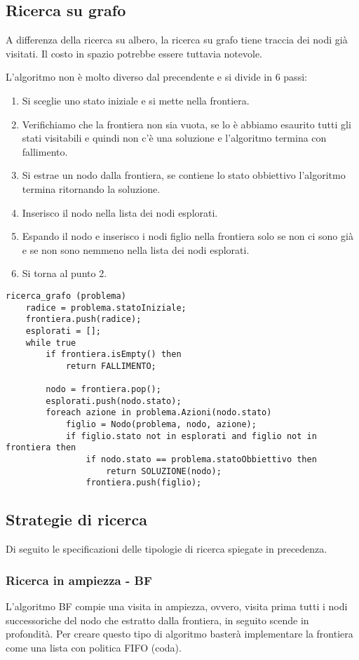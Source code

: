 \subsection{Ricerca su grafo}
A differenza della ricerca su albero, la ricerca su grafo tiene traccia dei nodi gi\`a
visitati. Il costo in spazio potrebbe essere tuttavia notevole.

L'algoritmo non \`e molto diverso dal precendente e si divide in 6 passi:
\begin{enumerate}
	\item Si sceglie uno stato iniziale e si mette nella frontiera.
	\item Verifichiamo che la frontiera non sia vuota, se lo \`e abbiamo esaurito tutti gli
	      stati visitabili e quindi non c'\`e una soluzione e l'algoritmo termina con
	      fallimento.
	\item Si estrae un nodo dalla frontiera, se contiene lo stato obbiettivo l'algoritmo
	      termina ritornando la soluzione.
	\item Inserisco il nodo nella lista dei nodi esplorati.
	\item Espando il nodo e inserisco i nodi figlio nella frontiera solo se non ci sono gi\`a
	      e se non sono nemmeno nella lista dei nodi esplorati.
	\item Si torna al punto 2.
\end{enumerate}

\begin{lstlisting}[style=pseudo-style]
ricerca_grafo (problema)
	radice = problema.statoIniziale;
	frontiera.push(radice);
	esplorati = [];
	while true
		if frontiera.isEmpty() then
			return FALLIMENTO;
		
		nodo = frontiera.pop();
		esplorati.push(nodo.stato);
		foreach azione in problema.Azioni(nodo.stato)
			figlio = Nodo(problema, nodo, azione);
			if figlio.stato not in esplorati and figlio not in frontiera then
				if nodo.stato == problema.statoObbiettivo then
					return SOLUZIONE(nodo);
				frontiera.push(figlio);
\end{lstlisting}

\subsection{Strategie di ricerca}
Di seguito le specificazioni delle tipologie di ricerca spiegate in precedenza.

\subsubsection{Ricerca in ampiezza - BF}
L'algoritmo BF compie una visita in ampiezza, ovvero, visita prima tutti i nodi
successoriche del nodo che estratto dalla frontiera, in seguito scende in profondit\`a.
Per creare questo tipo di algoritmo baster\`a implementare la frontiera come una lista
con politica FIFO (coda).

